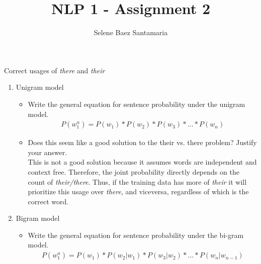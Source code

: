 \documentclass[12pt]{article}
\newenvironment{exercise}[2][Exercise]{\begin{trivlist}
\item[\hskip \labelsep {\bfseries #1}\hskip \labelsep {\bfseries #2.}]}{\end{trivlist}}
\begin{document}
 
 
 
\title{NLP 1 - Assignment 2}%
\author{Selene Baez Santamaria} %
\maketitle
 
\begin{exercise}{1. Spelling corrector} Correct usages of \textit{there} and \textit{their}
	
\begin{enumerate}[label=(\alph*)]

\item Unigram model 
	\begin{itemize}
	\item Write the general equation for sentence probability under the unigram model. \\
	\begin{align*}
	P(w_1^n) = P(w_1) * P(w_2) * P(w_3) * ... * P(w_n)
	\end{align*}
	
	\item Does this seem like a good solution to the their vs. there problem? Justify your answer. \\
	
	This is not a good solution because it assumes words are independent and context free. Therefore, the joint probability directly depends on the count of \textit{their/there}. Thus, if the training data has more of \textit{their} it will prioritize this usage over \textit{there}, and viceversa, regardless of which is the correct word.
	
	\end{itemize}
		  
\item Bigram model
	\begin{itemize}
	\item Write the general equation for sentence probability under the bi-gram model. \\
	\begin{align*}
	P(w_1^n) = P(w_1) * P(w_2|w_1) * P(w_3|w_2) * ... * P(w_n|w_{n-1})
	\end{align*}
	

\end{itemize}
\end{enumerate}
\end{exercise}
\end{document}
